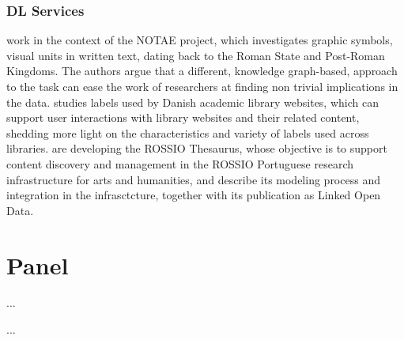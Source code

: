 \documentclass[sigconf, nonacm]{acmart}
\begin{document}
\subsubsection*{DL Services}
\citet{BernasconiBCCGL21} work in the context of the NOTAE project, which investigates graphic symbols, visual units in written text, dating back to the Roman State and Post-Roman Kingdoms. The authors argue that a different, knowledge graph-based, approach to the task can ease the work of researchers at finding non trivial implications in the data. 
\citet{Svarre21} studies labels used by Danish academic library websites, which can support user interactions with library websites and their related content, shedding more light on the characteristics and variety of labels used across libraries. 
\citet{AlmeidaFM21} are developing the ROSSIO Thesaurus, whose objective is to support content discovery and management in the ROSSIO Portuguese research infrastructure for arts and humanities, and describe its modeling process and integration in the infrasctcture, together with its publication as Linked Open Data.


\section{Panel}
...



\begin{acks}
...
\end{acks}



\end{document}
